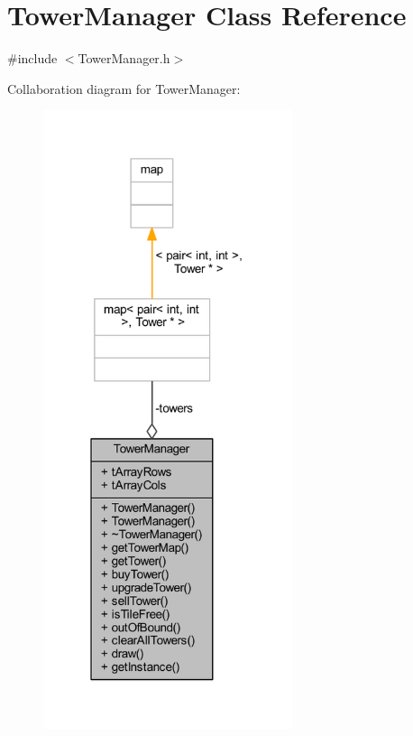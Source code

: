 \hypertarget{class_tower_manager}{\section{Tower\+Manager Class Reference}
\label{class_tower_manager}
}


{\ttfamily \#include $<$Tower\+Manager.\+h$>$}



Collaboration diagram for Tower\+Manager\+:\nopagebreak
\begin{figure}[H]
\begin{center}
\leavevmode
\includegraphics[width=207pt]{class_tower_manager__coll__graph}
\end{center}
\end{figure}
